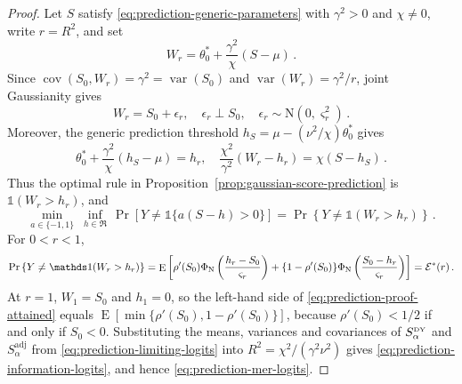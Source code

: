 \documentclass{article}
\DeclareMathOperator{\expect}{E}
\DeclareMathOperator{\var}{var}
\DeclareMathOperator{\cov}{cov}
\theoremstyle{definition}
\begin{document}
\begin{bibunit}
\begin{proof}
Let $S$ satisfy \eqref{eq:prediction-generic-parameters} with $\gamma^2>0$
and $\chi\neq0$, write $r=R^2$, and set
$$
    W_r
    =
    \theta_0^*+\frac{\gamma^2}{\chi}(S-\mu)\,.
$$
Since $\cov(S_0,W_r)=\gamma^2=\var(S_0)$ and
$\var(W_r)=\gamma^2/r$, joint Gaussianity gives
\begin{equation}
\label{eq:prediction-proof-channel}
    W_r=S_0+\epsilon_r,
    \quad
    \epsilon_r\perp S_0,
    \quad
    \epsilon_r\sim\mathrm N(0,\varsigma_r^2)\,.
\end{equation}
Moreover, the generic prediction threshold $h_S = \mu - (\nu^2 / \chi) \theta_0^*$ gives
$$
    \theta_0^*+\frac{\gamma^2}{\chi}(h_S-\mu)=h_r,
    \quad
    \frac{\chi^2}{\gamma^2}(W_r-h_r)=\chi(S-h_S)\,.
$$
Thus the optimal rule in
Proposition~\ref{prop:gaussian-score-prediction} is
$\mathds 1(W_r>h_r)$, and
\begin{equation}
\label{eq:prediction-proof-attained}
    \underset{a\in\{-1,1\}}{\min}\ 
    \underset{h\in\Re}{\inf}\,
    \Pr\left[Y\neq\mathds 1\{a(S-h)>0\}\right]
    =
    \Pr\left\{Y\neq\mathds 1(W_r>h_r)\right\}\,.
\end{equation}
For $0<r<1$, 
$$
\begin{aligned}
    \Pr\left\{Y\neq\mathds 1(W_r>h_r)\right\}
    =
    \expect\left[
        \rho'(S_0)\Phi_{\rm N}\left(\frac{h_r-S_0}{\varsigma_r}\right)
        +
        \{1-\rho'(S_0)\}
        \Phi_{\rm N}\left(\frac{S_0-h_r}{\varsigma_r}\right)
    \right]
    =
    \mathcal E^*(r)\,.
\end{aligned}
$$
At $r=1$, $W_1=S_0$ and $h_1=0$, so the left-hand side of
\eqref{eq:prediction-proof-attained} equals
$\expect[\min\{\rho'(S_0),1-\rho'(S_0)\}]$, because $\rho'(S_0)<1/2$ if and
only if $S_0<0$. 
Substituting the means, variances and covariances of
$S_\alpha^{\textrm{\tiny DY}}$ and $S_\alpha^{\mathrm{adj}}$ from
\eqref{eq:prediction-limiting-logits} into
$R^2=\chi^2/(\gamma^2\nu^2)$ gives
\eqref{eq:prediction-information-logits}, and hence
\eqref{eq:prediction-mer-logits}.


\end{proof}
\end{bibunit}
\end{document}
